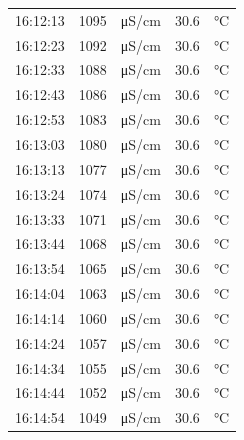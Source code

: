 \documentclass[11pt]{article}
\begin{document}
\begin{enumerate}
\begin{center}
\begin{tabular}{rrlrl}
16:12:13 & 1095 & μS/cm & 30.6 & °C\\
16:12:23 & 1092 & μS/cm & 30.6 & °C\\
16:12:33 & 1088 & μS/cm & 30.6 & °C\\
16:12:43 & 1086 & μS/cm & 30.6 & °C\\
16:12:53 & 1083 & μS/cm & 30.6 & °C\\
16:13:03 & 1080 & μS/cm & 30.6 & °C\\
16:13:13 & 1077 & μS/cm & 30.6 & °C\\
16:13:24 & 1074 & μS/cm & 30.6 & °C\\
16:13:33 & 1071 & μS/cm & 30.6 & °C\\
16:13:44 & 1068 & μS/cm & 30.6 & °C\\
16:13:54 & 1065 & μS/cm & 30.6 & °C\\
16:14:04 & 1063 & μS/cm & 30.6 & °C\\
16:14:14 & 1060 & μS/cm & 30.6 & °C\\
16:14:24 & 1057 & μS/cm & 30.6 & °C\\
16:14:34 & 1055 & μS/cm & 30.6 & °C\\
16:14:44 & 1052 & μS/cm & 30.6 & °C\\
16:14:54 & 1049 & μS/cm & 30.6 & °C\\
\end{tabular}
\end{center}


\end{enumerate}
\end{document}
